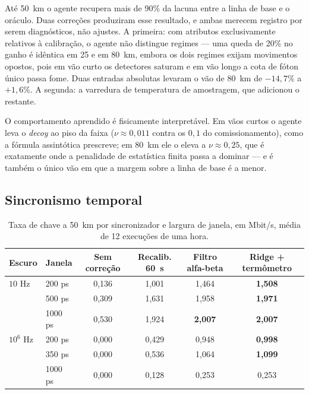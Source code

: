 \documentclass[12pt]{article}
\begin{document}
Até 50~km o agente recupera mais de 90\% da lacuna entre a linha de base e o
oráculo. Duas correções produziram esse resultado, e ambas merecem registro por
serem diagnósticos, não ajustes. A primeira: com atributos exclusivamente
relativos à calibração, o agente não distingue regimes --- uma queda de 20\% no
ganho é idêntica em 25 e em 80~km, embora os dois regimes exijam movimentos
opostos, pois em vão curto os detectores saturam e em vão longo a cota de fóton
único passa fome. Duas entradas absolutas levaram o vão de 80~km de $-14{,}7\%$ a
$+1{,}6\%$. A segunda: a varredura de temperatura de amostragem, que adicionou o
restante.

O comportamento aprendido é fisicamente interpretável. Em vãos curtos o agente
leva o \emph{decoy} ao piso da faixa ($\nu \approx 0{,}011$ contra os $0{,}1$ do
comissionamento), como a fórmula assintótica prescreve; em 80~km ele o eleva a
$\nu \approx 0{,}25$, que é exatamente onde a penalidade de estatística finita
passa a dominar --- e é também o único vão em que a margem sobre a linha de base
é a menor.

\subsection{Sincronismo temporal}

\begin{table}[htbp]
\centering
\caption{Taxa de chave a 50~km por sincronizador e largura de janela, em Mbit/s,
média de 12 execuções de uma hora.}
\label{tab:sinc}
\small
\begin{tabular}{@{}llcccc@{}}
\toprule
\textbf{Escuro} & \textbf{Janela} & \textbf{Sem correção} & \textbf{Recalib. 60~s} & \textbf{Filtro alfa-beta} & \textbf{Ridge + termômetro} \\
\midrule
$10$ Hz    & 200 ps  & 0,136 & 1,001 & 1,464 & \textbf{1,508} \\
           & 500 ps  & 0,309 & 1,631 & 1,958 & \textbf{1,971} \\
           & 1000 ps & 0,530 & 1,924 & \textbf{2,007} & \textbf{2,007} \\
$10^6$ Hz  & 200 ps  & 0,000 & 0,429 & 0,948 & \textbf{0,998} \\
           & 350 ps  & 0,000 & 0,536 & 1,064 & \textbf{1,099} \\
           & 1000 ps & 0,000 & 0,128 & 0,253 & 0,253 \\
\bottomrule
\end{tabular}
\end{table}
\end{document}
